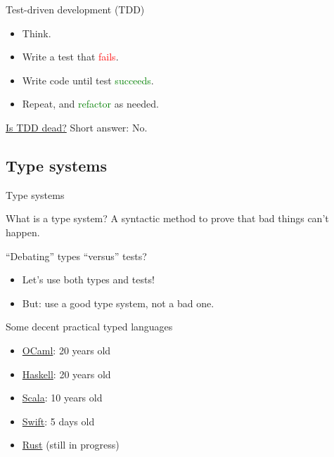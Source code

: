 \begin{frame}{Test-driven development (TDD)}
  \begin{itemize}
  \item Think.
  \item Write a test that \textcolor{red}{fails}.
  \item Write code until test \textcolor{green}{succeeds}.
  \item Repeat, and \textcolor{green}{refactor} as needed.
  \end{itemize}

  \begin{block}{\href{http://martinfowler.com/articles/is-tdd-dead/}{Is TDD dead?}}
    Short answer: No.
  \end{block}
\end{frame}

\subsection{Type systems}

\begin{frame}{Type systems}
  \begin{block}{What is a type system?}
    A \alert{syntactic} method to \alert{prove} that bad things can't happen.
  \end{block}

  \begin{block}{``Debating'' types ``versus'' tests?}
    \begin{itemize}
    \item Let's use both types and tests!
    \item But: use a \alert{good} type system, not a bad one.
    \end{itemize}
  \end{block}

  \begin{block}{Some decent practical typed languages}
    \begin{itemize}
    \item \href{http://ocaml.org/}{OCaml}: 20 years old
    \item \href{http://www.haskell.org/}{Haskell}: 20 years old
    \item \href{http://www.scala-lang.org/}{Scala}: 10 years old
    \item \href{http://developer.apple.com/swift/}{Swift}: 5 days old
    \item \href{http://www.rust-lang.org/}{Rust} (still in progress)
    \end{itemize}
  \end{block}
\end{frame}

